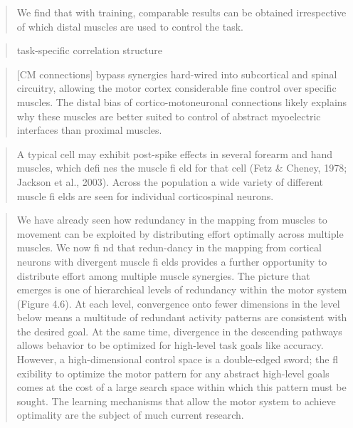 \documentclass[../main.tex]{subfiles}
\begin{document}
\begin{quote}
We find that with training, comparable results can be obtained irrespective of which distal muscles are used to control the task.
\end{quote}

\begin{quote}
task-specific correlation structure
\end{quote}

\begin{quote}
{[}CM connections{]} bypass synergies hard-wired into subcortical and spinal circuitry, allowing the motor cortex considerable fine control over specific muscles. The distal bias of cortico-motoneuronal connections likely explains why these muscles are better suited to control of abstract myoelectric interfaces than proximal muscles.
\end{quote}

\begin{quote}
A typical cell may exhibit post-spike effects in several forearm and hand muscles, which defi nes the muscle fi eld for that cell (Fetz \& Cheney, 1978; Jackson et al., 2003). Across the population a wide variety of different muscle fi elds are seen for individual corticospinal neurons.
\end{quote}

\begin{quote}
We have already seen how redundancy in the mapping from muscles to movement can be exploited by distributing effort optimally across multiple muscles. We now fi nd that redun-dancy in the mapping from cortical neurons with divergent muscle fi elds provides a further opportunity to distribute effort among multiple muscle synergies. The picture that emerges is one of hierarchical levels of redundancy within the motor system (Figure 4.6). At each level, convergence onto fewer dimensions in the level below means a multitude of redundant activity patterns are consistent with the desired goal. At the same time, divergence in the descending pathways allows behavior to be optimized for high-level task goals like accuracy. However, a high-dimensional control space is a double-edged sword; the fl exibility to optimize the motor pattern for any abstract high-level goals comes at the cost of a large search space within which this pattern must be sought. The learning mechanisms that allow the motor system to achieve optimality are the subject of much current research.
\end{quote}

\begin{quote}
\end{quote}
\end{document}
